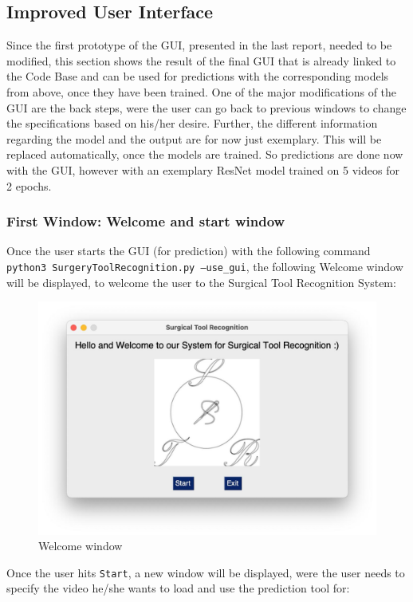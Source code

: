 \documentclass{article}
\begin{document}
\subsection{Improved User Interface}
Since the first prototype of the GUI, presented in the last report, needed to be modified, this section shows the result of the final GUI that is already linked to the Code Base and can be used for predictions with the corresponding models from above, once they have been trained. One of the major modifications of the GUI are the back steps, were the user can go back to previous windows to change the specifications based on his/her desire. Further, the different information regarding the model and the output are for now just exemplary. This will be replaced automatically, once the models are trained. So predictions are done now with the GUI, however with an exemplary ResNet model trained on 5 videos for 2 epochs.

\subsubsection{First Window: Welcome and start window}
Once the user starts the GUI (for prediction) with the following command 
\texttt{python3 SurgeryToolRecognition.py --use\_gui}, the following Welcome window will be displayed, to welcome the user to the Surgical Tool Recognition System:
\begin{figure}[H]
    \centering
    \includegraphics[width = \linewidth]{Welcome_window.jpg}
    \caption{Welcome window}
\end{figure}
\noindent
Once the user hits \texttt{Start}, a new window will be displayed, were the user needs to specify the video he/she wants to load and use the prediction tool for:
\end{document}
